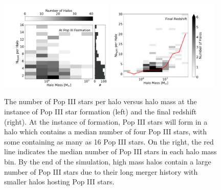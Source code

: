 \documentclass[a4paper,fleqn,usenatbib]{mnras}
\begin{document}
\begin{figure}
  \centering
  \includegraphics[width=0.48\textwidth]{images/totnump3_halomass_sidehist.pdf}
  \hfill
  \includegraphics[width=0.48\textwidth]{images/final_redshift_Np3_mass.pdf}
  \caption{The number of Pop III stars per halo versus halo mass at the instance of Pop III star formation (left) and the final redshift (right). At the instance of formation, Pop III stars will form in a halo which contains a median number of four Pop III stars, with some containing as many as 16 Pop III stars. On the right, the red line indicates the median number of Pop III stars in each halo mass bin. By the end of the simulation, high mass halos contain a large number of Pop III stars due to their long merger history with smaller halos hosting Pop III stars.}
  \label{fig:num_p3}
\end{figure}
\end{document}
